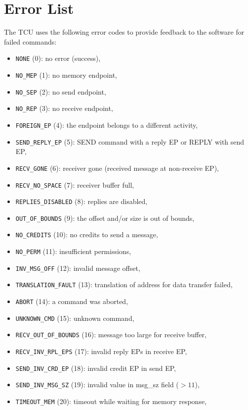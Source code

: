\section{Error List}

The TCU uses the following error codes to provide feedback to the software for failed commands:

\begin{itemize}
  \item \texttt{NONE} (0): no error (success),
  \item \texttt{NO\_MEP} (1): no memory endpoint,
  \item \texttt{NO\_SEP} (2): no send endpoint,
  \item \texttt{NO\_REP} (3): no receive endpoint,
  \item \texttt{FOREIGN\_EP} (4): the endpoint belongs to a different activity,
  \item \texttt{SEND\_REPLY\_EP} (5): SEND command with a reply EP or REPLY with send EP,
  \item \texttt{RECV\_GONE} (6): receiver gone (received message at non-receive EP),
  \item \texttt{RECV\_NO\_SPACE} (7): receiver buffer full,
  \item \texttt{REPLIES\_DISABLED} (8): replies are disabled,
  \item \texttt{OUT\_OF\_BOUNDS} (9): the offset and/or size is out of bounds,
  \item \texttt{NO\_CREDITS} (10): no credits to send a message,
  \item \texttt{NO\_PERM} (11): insufficient permissions,
  \item \texttt{INV\_MSG\_OFF} (12): invalid message offset,
  \item \texttt{TRANSLATION\_FAULT} (13): translation of address for data transfer failed,
  \item \texttt{ABORT} (14): a command was aborted,
  \item \texttt{UNKNOWN\_CMD} (15): unknown command,
  \item \texttt{RECV\_OUT\_OF\_BOUNDS} (16): message too large for receive buffer,
  \item \texttt{RECV\_INV\_RPL\_EPS} (17): invalid reply EPs in receive EP,
  \item \texttt{SEND\_INV\_CRD\_EP} (18): invalid credit EP in send EP,
  \item \texttt{SEND\_INV\_MSG\_SZ} (19): invalid value in msg\_sz field ($> 11$),
  \item \texttt{TIMEOUT\_MEM} (20): timeout while waiting for memory response,

\end{itemize}
